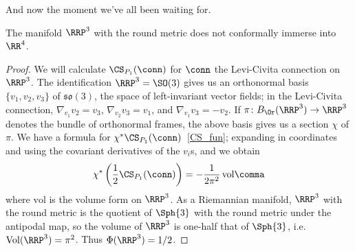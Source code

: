 And now the moment we've all been waiting for.

\begin{thm}[{\cite[\S 6, Example 1]{cs}}]
	\label{nope_RP3}
	The manifold $\RRP^3$ with the round metric does not conformally immerse into $\RR^4$.
\end{thm}

\begin{proof}
	We will calculate $\CS_{P_1}(\conn)$ for $\conn$ the Levi-Civita connection on $\RRP^3$. The identification
	$\RRP^3 = \SO(3)$ gives us an orthonormal basis $\{v_1, v_2, v_3\}$ of $\mathfrak{so}(3)$, the space of
	left-invariant vector fields; in the Levi-Civita connection, $\nabla_{v_1}v_2 = v_3$, $\nabla_{v_2}v_3 = v_1$, and
	$\nabla_{v_1}v_3 = -v_2$. If $\pi\colon B_{\Or}(\RRP^3)\to\RRP^3$ denotes the bundle of orthonormal frames, the
	above basis gives us a section $\chi$ of $\pi$. We have a formula for $\chi^*\CS_{P_1}(\conn)$~\eqref{CS_fun};
	expanding in coordinates and using the covariant derivatives of the $v_i$s, and we obtain
	\begin{equation}
		\chi^*\left(\frac 12\CS_{P_1}(\conn)\right) = -\frac{1}{2\pi^2} \,\mathrm{vol}\comma
	\end{equation}
	where $\mathrm{vol}$ is the volume form on $\RRP^3$. As a Riemannian manifold, $\RRP^3$ with the round metric is
	the quotient of $\Sph{3}$ with the round metric under the antipodal map, so the volume of $\RRP^3$ is one-half that of
	$\Sph{3}$, i.e.\ $\mathrm{Vol}(\RRP^3) = \pi^2$. Thus $\Phi(\RRP^3) = 1/2$.
\end{proof}
%
%
